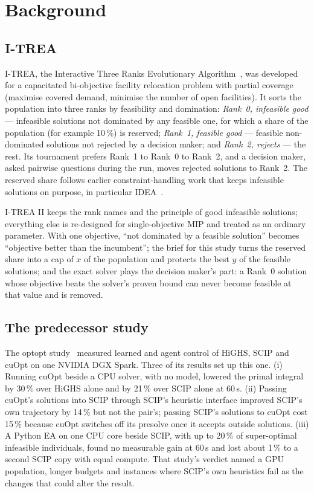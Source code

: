 \section{Background}\label{sec:background}

\subsection{I-TREA}
I-TREA, the Interactive Three Ranks Evolutionary Algorithm~\citep{orbay2011itrea}, was developed for a capacitated
bi-objective facility relocation problem with partial coverage (maximise covered demand, minimise the number of open
facilities). It sorts the population into three ranks by feasibility and domination: \emph{Rank~0, infeasible good}
--- infeasible solutions not dominated by any feasible one, for which a share of the population (for example 10\,\%) is
reserved; \emph{Rank~1, feasible good} --- feasible non-dominated solutions not rejected by a decision maker; and
\emph{Rank~2, rejects} --- the rest. Its tournament prefers Rank~1 to Rank~0 to Rank~2, and a decision maker,
asked pairwise questions during the run, moves rejected solutions to Rank~2. The reserved share follows earlier
constraint-handling work that keeps infeasible solutions on purpose, in particular IDEA~\citep{singh2011thesis}.

I-TREA II keeps the rank names and the principle of good infeasible solutions; everything else is re-designed for
single-objective MIP and treated as an ordinary parameter. With one objective, ``not dominated by a feasible solution''
becomes ``objective better than the incumbent''; the brief for this study turns the reserved share into a cap of
$x$ of the population and protects the best $y$ of the feasible solutions; and the exact solver plays the decision
maker's part: a Rank~0 solution whose objective beats the solver's proven bound can never become feasible at that value
and is removed.

\subsection{The predecessor study}
The optopt study~\citep{orbay2026optopt} measured learned and agent control of HiGHS, SCIP and cuOpt on one NVIDIA DGX
Spark. Three of its results set up this one. (i) Running cuOpt beside a CPU solver, with no model, lowered the primal
integral by 30\,\% over HiGHS alone and by 21\,\% over SCIP alone at 60\,s. (ii) Passing cuOpt's solutions into SCIP
through SCIP's heuristic interface improved SCIP's own trajectory by 14\,\% but not the pair's; passing SCIP's
solutions to cuOpt cost 15\,\% because cuOpt switches off its presolve once it accepts outside solutions. (iii) A
Python EA on one CPU core beside SCIP, with up to 20\,\% of super-optimal infeasible individuals, found no measurable
gain at 60\,s and lost about 1\,\% to a second SCIP copy with equal compute. That study's verdict named a GPU
population, longer budgets and instances where SCIP's own heuristics fail as the changes that could alter the result.


